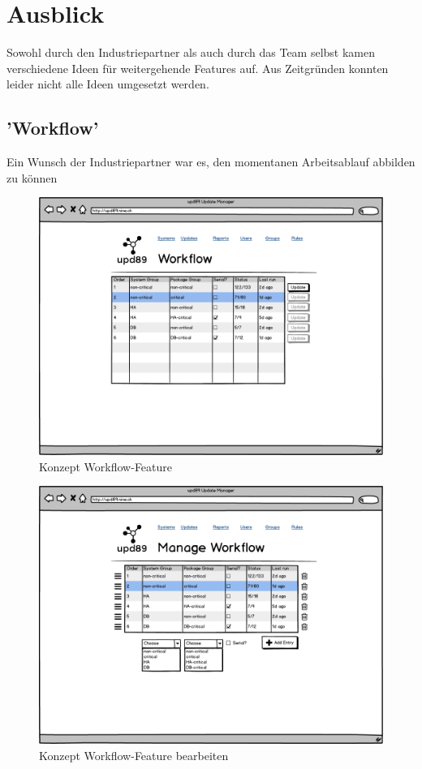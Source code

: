 \chapter{Ausblick}

Sowohl durch den Industriepartner als auch durch das Team selbst kamen verschiedene Ideen für weitergehende Features auf. Aus Zeitgründen konnten leider nicht alle Ideen umgesetzt werden.

\section{'Workflow'}

Ein Wunsch der Industriepartner war es, den momentanen Arbeitsablauf abbilden zu können



\begin{figure}[H]
	\centering
	\includegraphics[width=\linewidth]{files/mockups/workflow}
	\caption{Konzept Workflow-Feature}
	\label{fig:ausblick:workflow}
\end{figure}

\begin{figure}[H]
	\centering
	\includegraphics[width=\linewidth]{files/mockups/workflow_CRUD}
	\caption{Konzept Workflow-Feature bearbeiten}
	\label{fig:ausblick:workflow_crud}
\end{figure}





